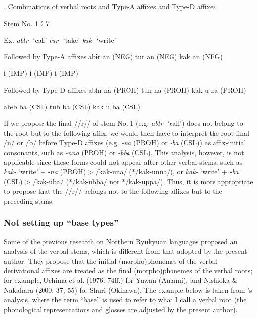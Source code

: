 \begin{styleBeschriftung}
\textmd{. Combinations of verbal roots and Type-A affixes and Type-D affixes}
\end{styleBeschriftung}

Stem No.  1    2    7

Ex.  \textit{abɨr-} ‘call’    \textit{tur-} ‘take’    \textit{kak-} ‘write’

Followed by Type-A affixes  abɨr    an (NEG)    tur    an (NEG)    kak    an (NEG)

      ɨ (IMP)        ɨ (IMP)        ɨ (IMP)

Followed by Type-D affixes  abɨn    na (PROH)    tun    na (PROH)    kak  u  na (PROH)

  abɨb    ba (CSL)    tub    ba (CSL)    kak  u  ba (CSL)

If we propose the final //r// of stem No. 1 (e.g. \textit{abɨr-} ‘call’) does not belong to the root but to the following affix, we would then have to interpret the root-final /n/ or /b/ before Type-D affixes (e.g. \textit{{}-na} (PROH) or \textit{{}-ba} (CSL)) as affix-initial consonants, such as \textit{{}-nna} (PROH) or \textit{{}-bba} (CSL). This analysis, however, is not applicable since these forms could not appear after other verbal stems, such as \textit{kak-} ‘write’ + \textit{{}-na} (PROH) > /kak-una/ (*/kak-unna/), or \textit{kak-} ‘write’ + \textit{{}-ba} (CSL) > /kak-uba/ (*/kak-ubba/ nor */kak-uppa/). Thus, it is more appropriate to propose that the //r// belongs not to the following affixes but to the preceding stems.

\subsubsection{Not setting up “base types”}

Some of the previous research on Northern Ryukyuan languages proposed an analysis of the verbal stems, which is different from that adopted by the present author. They propose that the initial (morpho)phonemes of the verbal derivational affixes are treated as the final (morpho)phonemes of the verbal roots; for example, Uchima et al. (1976: 74ff.) for Yuwan (Amami), and Nishioka \& Nakahara (2000: 37, 55) for Shuri (Okinawa). The example below is taken from \citet{UchimaEtAl1976}’s analysis, where the term “base” is used to refer to what I call a verbal root (the phonological representations and glosses are adjusted by the present author).

